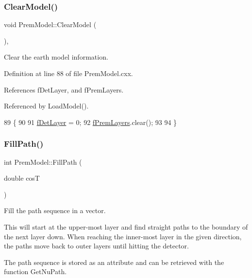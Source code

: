 \subsubsection{\texorpdfstring{Clear\+Model()}{ClearModel()}}
{\footnotesize\ttfamily void Prem\+Model\+::\+Clear\+Model (\begin{DoxyParamCaption}{ }\end{DoxyParamCaption})\hspace{0.3cm}{\ttfamily [protected]}, {\ttfamily [virtual]}}

Clear the earth model information. 

Definition at line 88 of file Prem\+Model.\+cxx.



References f\+Det\+Layer, and f\+Prem\+Layers.



Referenced by Load\+Model().


\begin{DoxyCode}
89 \{
90 
91   \hyperlink{classOscProb_1_1PremModel_a4fb68506493666349f418b893a996185}{fDetLayer} = 0;
92   \hyperlink{classOscProb_1_1PremModel_a19a9a3b23ec154ad7a29f92b74aa5bc6}{fPremLayers}.clear();
93 
94 \}
\end{DoxyCode}
\mbox{\label{classOscProb_1_1PremModel_ac69162cc5e3c8b7c1b8a85571ff2063b}} 
\subsubsection{\texorpdfstring{Fill\+Path()}{FillPath()}}
{\footnotesize\ttfamily int Prem\+Model\+::\+Fill\+Path (\begin{DoxyParamCaption}\item[{double}]{cosT }\end{DoxyParamCaption})\hspace{0.3cm}{\ttfamily [virtual]}}

Fill the path sequence in a vector.

This will start at the upper-\/most layer and find straight paths to the boundary of the next layer down. When reaching the inner-\/most layer in the given direction, the paths move back to outer layers until hitting the detector.

The path sequence is stored as an attribute and can be retrieved with the function Get\+Nu\+Path.


